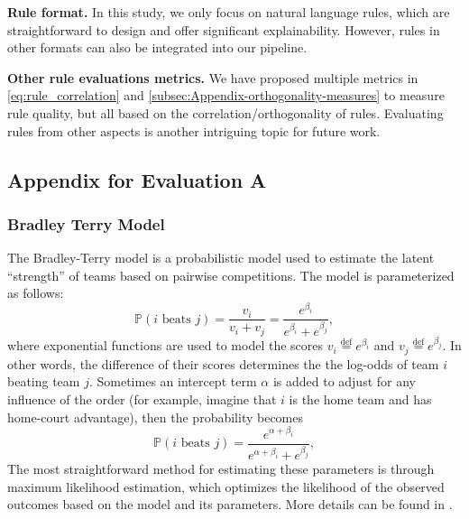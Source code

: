 \documentclass{article}
\newcommand{\bydef}{\stackrel{\text{def}}{=}}
\begin{document}
\textbf{Rule format.} In this study, we only focus on natural language rules, which are straightforward to design and offer significant explainability. However, rules in other formats can also be integrated into our pipeline.

\textbf{Other rule evaluations metrics.} We have proposed multiple metrics in \ref{eq:rule_correlation} and \ref{subsec:Appendix-orthogonality-measures} to measure rule quality, but all based on the correlation/orthogonality of rules. Evaluating rules from other aspects is another intriguing topic for future work.



\subsection{Appendix for Evaluation A}\label{subsec:Appendix-EvalA}

\subsubsection{Bradley Terry Model}\label{subsubsec:Appendix-EvalA-BradleyTerry}
The Bradley-Terry model is a probabilistic model used to estimate the latent ``strength” of teams based on pairwise competitions. The model is parameterized as follows:
\begin{equation}\label{eq:bradley-terry}
    \mathbb{P}(i \text{ beats }j) = \frac{v_i}{v_i + v_j} = \frac{e^{\beta_i}}{e^{\beta_i} + e^{\beta_j}},
\end{equation}
where exponential functions are used to model the scores $v_i \bydef e^{\beta_i}$ and $v_j \bydef e^{\beta_j}$. In other words, the difference of their scores determines the the log-odds of team $i$ beating team $j$. Sometimes an intercept term $\alpha$ is added to adjust for any influence of the order (for example, imagine that $i$ is the home team and has home-court advantage), then the probability becomes
\begin{equation}\label{eq:bradley-terry2}
    \mathbb{P}(i \text{ beats }j) = \frac{e^{\alpha + \beta_i}}{e^{\alpha + \beta_i} + e^{\beta_j}},
\end{equation}
The most straightforward method for estimating these parameters is through maximum likelihood estimation, which optimizes the likelihood of the observed outcomes based on the model and its parameters. More details can be found in \citet{bradley1952rank, hunter2004mm}.
\end{document}
